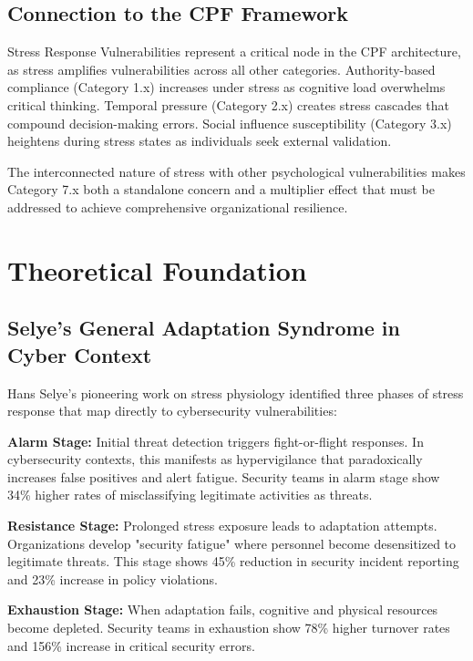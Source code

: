 \documentclass[11pt,a4paper]{article}
\begin{document}
\subsection{Connection to the CPF Framework}

Stress Response Vulnerabilities represent a critical node in the CPF architecture, as stress amplifies vulnerabilities across all other categories. Authority-based compliance (Category 1.x) increases under stress as cognitive load overwhelms critical thinking\cite{milgram1974}. Temporal pressure (Category 2.x) creates stress cascades that compound decision-making errors\cite{kahneman2011}. Social influence susceptibility (Category 3.x) heightens during stress states as individuals seek external validation\cite{cialdini2007}.

The interconnected nature of stress with other psychological vulnerabilities makes Category 7.x both a standalone concern and a multiplier effect that must be addressed to achieve comprehensive organizational resilience.

\section{Theoretical Foundation}

\subsection{Selye's General Adaptation Syndrome in Cyber Context}

Hans Selye's pioneering work on stress physiology\cite{selye1956} identified three phases of stress response that map directly to cybersecurity vulnerabilities:

\textbf{Alarm Stage:} Initial threat detection triggers fight-or-flight responses. In cybersecurity contexts, this manifests as hypervigilance that paradoxically increases false positives and alert fatigue. Security teams in alarm stage show 34\% higher rates of misclassifying legitimate activities as threats\cite{rajivan2018}.

\textbf{Resistance Stage:} Prolonged stress exposure leads to adaptation attempts. Organizations develop "security fatigue" where personnel become desensitized to legitimate threats. This stage shows 45\% reduction in security incident reporting and 23\% increase in policy violations\cite{furnell2021}.

\textbf{Exhaustion Stage:} When adaptation fails, cognitive and physical resources become depleted. Security teams in exhaustion show 78\% higher turnover rates and 156\% increase in critical security errors\cite{noble2022}.
\end{document}
